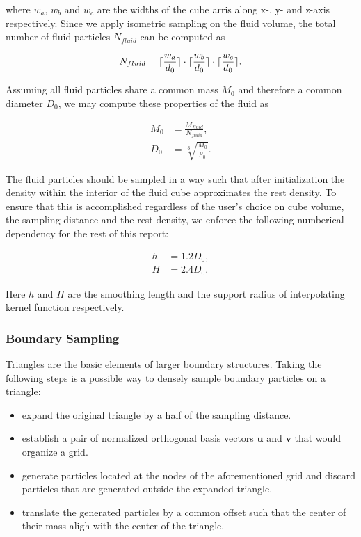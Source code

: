 \documentclass[
	11pt, 
	DIV10,
	ngerman,
	a4paper, 
	oneside, 
	headings=normal, 
	captions=tableheading,
	final, 
	numbers=noenddot
]{scrartcl}
\DeclarePairedDelimiter{\ceil}{\lceil}{\rceil}
\begin{document}
where $ w_{a} $, $ w_{b} $ and $ w_{c} $ are the widths of the cube arris along x-, y- and z-axis respectively. Since we apply isometric sampling on the fluid volume, the total number of fluid particles $ N_{fluid} $ can be computed as

\begin{equation}
	\label{eq2}
	N_{fluid} = \ceil{\frac{w_{a}}{d_{0}}} \cdot \ceil{\frac{w_{b}}{d_{0}}} \cdot \ceil{\frac{w_{c}}{d_{0}}}.
\end{equation}

Assuming all fluid particles share a common mass $ M_{0} $ and therefore a common diameter $ D_{0} $, we may compute these properties of the fluid as

\begin{equation}
\begin{split}
	\label{eq3}
	M_{0} &= \frac{M_{fluid}}{N_{fluid}}, \\
	D_{0} &= \sqrt[3]{\frac{M_{0}}{\rho_{0}}}.
\end{split}
\end{equation}

The fluid particles should be sampled in a way such that after initialization the density within the interior of the fluid cube approximates the rest density. To ensure that this is accomplished regardless of the user's choice on cube volume, the sampling distance and the rest density, we enforce the following numberical dependency for the rest of this report:

\begin{equation}
\begin{split}
	\label{eq4}
	h &= 1.2D_{0}, \\
	H &= 2.4D_{0}.
\end{split}
\end{equation}

Here $ h $ and $ H $ are the smoothing length and the support radius of interpolating kernel function respectively.

\subsubsection{Boundary Sampling}

Triangles are the basic elements of larger boundary structures. Taking the following steps is a possible way to densely sample boundary particles on a triangle:

\begin{itemize}
    \item expand the original triangle by a half of the sampling distance.
    \item establish a pair of normalized orthogonal basis vectors $ \boldsymbol{u} $ and $ \boldsymbol{v} $ that would organize a grid.
    \item generate particles located at the nodes of the aforementioned grid and discard particles that are generated outside the expanded triangle.
    \item translate the generated particles by a common offset such that the center of their mass aligh with the center of the triangle.
\end{itemize}
\end{document}
